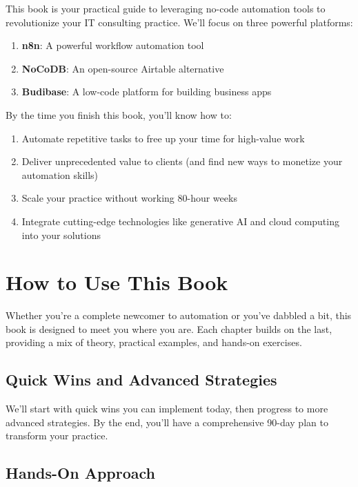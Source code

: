 This book is your practical guide to leveraging no-code automation tools to revolutionize your IT consulting practice. We'll focus on three powerful platforms:

\begin{enumerate}
    \item \textbf{n8n}: A powerful workflow automation tool
    \item \textbf{NoCoDB}: An open-source Airtable alternative
    \item \textbf{Budibase}: A low-code platform for building business apps
\end{enumerate}

By the time you finish this book, you'll know how to:

\begin{enumerate}
    \item Automate repetitive tasks to free up your time for high-value work
    \item Deliver unprecedented value to clients (and find new ways to monetize your automation skills)
    \item Scale your practice without working 80-hour weeks
    \item Integrate cutting-edge technologies like generative AI and cloud computing into your solutions
\end{enumerate}

\section{How to Use This Book}

Whether you're a complete newcomer to automation or you've dabbled a bit, this book is designed to meet you where you are. Each chapter builds on the last, providing a mix of theory, practical examples, and hands-on exercises.

\subsection{Quick Wins and Advanced Strategies}

We'll start with quick wins you can implement today, then progress to more advanced strategies. By the end, you'll have a comprehensive 90-day plan to transform your practice.

\subsection{Hands-On Approach}

